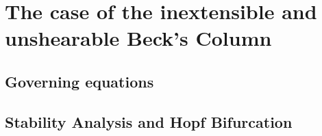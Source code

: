 
\section{The case of the inextensible and unshearable Beck's Column}
\subsection{Governing equations}
\subsection{Stability Analysis and Hopf Bifurcation}
